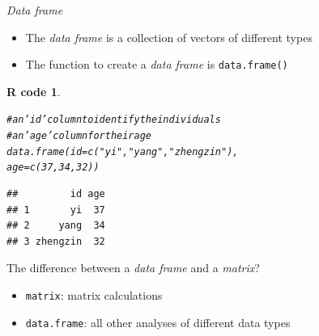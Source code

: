 \documentclass[11pt]{beamer}\usepackage[]{graphicx}\usepackage[]{color}
\makeatletter
\newcommand{\hlnum}[1]{\textcolor[rgb]{0.063,0.58,0.627}{#1}}%
\newcommand{\hlstr}[1]{\textcolor[rgb]{0.063,0.58,0.627}{#1}}%
\newcommand{\hlcom}[1]{\textcolor[rgb]{0.588,0.588,0.588}{#1}}%
\newcommand{\hlstd}[1]{\textcolor[rgb]{0.196,0.196,0.196}{#1}}%
\newcommand{\hlkwc}[1]{\textcolor[rgb]{0,0.631,0.314}{#1}}%
\newcommand{\hlkwd}[1]{\textcolor[rgb]{0.78,0.227,0.412}{#1}}%
\newenvironment{kframe}{%
 \def\at@end@of@kframe{}%
 \ifinner\ifhmode%
  \def\at@end@of@kframe{\end{minipage}}%
  \begin{minipage}{\columnwidth}%
 \fi\fi%
 \def\FrameCommand##1{\hskip\@totalleftmargin \hskip-\fboxsep
 \colorbox{shadecolor}{##1}\hskip-\fboxsep
     \hskip-\linewidth \hskip-\@totalleftmargin \hskip\columnwidth}%
 \MakeFramed {\advance\hsize-\width
   \@totalleftmargin\z@ \linewidth\hsize
   \@setminipage}}%
 {\par\unskip\endMakeFramed%
 \at@end@of@kframe}
\newenvironment{knitrout}{}{} %
\newtheorem{rcode}{R code}[section]
\newcommand{\code}[1]{\texttt{#1}}
\makeatother
\begin{document}
\begin{frame}[fragile]{\textit{Data frame}}

\begin{itemize}
  \setlength\itemsep{0.5em}
\item The \textit{data frame} is a collection of vectors of different types
\pause \item The function to create a \textit{data frame} is \code{data.frame()}
\end{itemize}
\pause
\begin{knitrout}
\color{fgcolor}\begin{kframe}
\begin{rcode}\label{unnamed-chunk-21}\begin{alltt}
\hlcom{# an 'id'  column to identify the individuals}
\hlcom{# an 'age' column for their age}
\hlkwd{data.frame}\hlstd{(}\hlkwc{id} \hlstd{=} \hlkwd{c}\hlstd{(}\hlstr{"yi"}\hlstd{,}\hlstr{"yang"}\hlstd{,}\hlstr{"zhengzin"}\hlstd{),}
           \hlkwc{age} \hlstd{=} \hlkwd{c}\hlstd{(}\hlnum{37}\hlstd{,}\hlnum{34}\hlstd{,}\hlnum{32}\hlstd{))}
\end{alltt}
\begin{verbatim}
##         id age
## 1       yi  37
## 2     yang  34
## 3 zhengzin  32
\end{verbatim}
\end{rcode}\end{kframe}
\end{knitrout}

\end{frame}




\begin{frame}[fragile]{The difference between a \textit{data frame} and a \textit{matrix}?}

\begin{itemize}
  \setlength\itemsep{2em}
  \normalsize
\item \code{matrix}: matrix calculations
\item \code{data.frame}: all other analyses of different data types
\end{itemize}

\end{frame}
\end{document}
